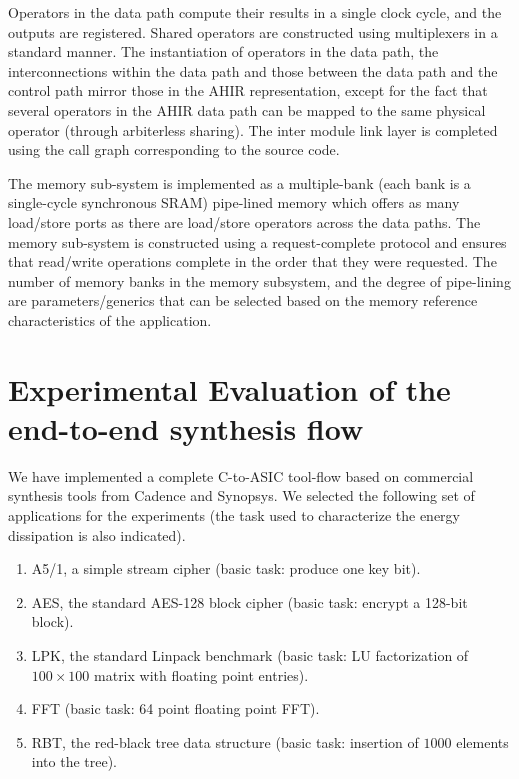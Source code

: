 \documentclass[conference]{IEEEtran}
\begin{document}
Operators in the data path compute their results in a single clock
cycle, and the outputs are registered. Shared operators are
constructed using multiplexers in a standard manner. The instantiation
of operators in the data path, the interconnections within the data
path and those between the data path and the control path mirror those
in the AHIR representation, except for the fact that several operators
in the AHIR data path can be mapped to the same physical operator
(through arbiterless sharing). The inter module link layer is
completed using the call graph corresponding to the source code.

The memory sub-system is implemented as a multiple-bank (each
bank is a single-cycle synchronous SRAM)
pipe-lined memory which offers as many load/store ports as
there are load/store operators across the data paths.  The memory
sub-system is constructed using a request-complete protocol and
ensures that read/write operations complete in the order
that they were requested. The number of memory banks in the memory
subsystem,
and the degree of pipe-lining are parameters/generics that
can be selected based on the memory reference characteristics
of the application.

\section{Experimental Evaluation of the end-to-end synthesis flow}

We have implemented a complete C-to-ASIC tool-flow based on commercial
synthesis tools from Cadence and Synopsys.  We selected the
following set of applications for the experiments (the task used
to characterize the energy dissipation is also indicated).
\begin{enumerate}
\item A5/1, a simple stream cipher (basic task: produce one key bit).
\item AES, the standard AES-128 block cipher (basic task: encrypt a 128-bit block).
\item LPK, the standard Linpack benchmark (basic task: LU factorization of $100\times100$ matrix with
floating point entries).
\item FFT (basic task: 64 point floating point FFT).
\item RBT, the red-black tree data structure (basic task: insertion of $1000$ elements into
the tree).
\end{enumerate}
\end{document}
